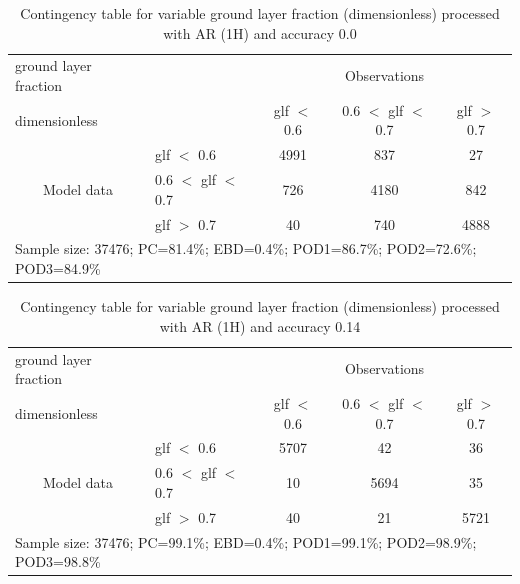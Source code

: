 \documentclass[a4paper,english]{article}
\begin{document}
\begin{table}[]
\begin{center}
\begin{tabular}{llccc}
\hline
{ground layer fraction}                                       &                                                    & \multicolumn{3}{c}{Observations}                 \\
{dimensionless}                                       &                             & glf $<$ 0.6   & 0.6 $<$ glf $<$ 0.7 & glf $>$ 0.7 \\
\hline
\multicolumn{1}{c}{\multirow{3}{*}{Model data}}  & glf $<$ 0.6             & 4991                & 837                       & 27              \\
                                                 & 0.6  $<$ glf $<$ 0.7 & 726                & 4180                       & 842              \\
                                                 & glf $>$ 0.7             & 40                & 740                       & 4888              \\
\hline
\multicolumn{5}{l}{Sample size: 37476; PC=81.4\%; EBD=0.4\%; POD1=86.7\%; POD2=72.6\%; POD3=84.9\%}
\end{tabular}
\end{center}
\caption{Contingency table for variable ground layer fraction (dimensionless) processed with AR (1H) and accuracy 0.0}
\label{tab:contingencyglfAFT}
\end{table}
\begin{table}[]
\begin{center}
\begin{tabular}{llccc}
\hline
{ground layer fraction}                                       &                                                    & \multicolumn{3}{c}{Observations}                 \\
{dimensionless}                                       &                             & glf $<$ 0.6   & 0.6 $<$ glf $<$ 0.7 & glf $>$ 0.7 \\
\hline
\multicolumn{1}{c}{\multirow{3}{*}{Model data}}  & glf $<$ 0.6             & 5707                & 42                       & 36              \\
                                                 & 0.6  $<$ glf $<$ 0.7 & 10                & 5694                       & 35              \\
                                                 & glf $>$ 0.7             & 40                & 21                       & 5721              \\
\hline
\multicolumn{5}{l}{Sample size: 37476; PC=99.1\%; EBD=0.4\%; POD1=99.1\%; POD2=98.9\%; POD3=98.8\%}
\end{tabular}
\end{center}
\caption{Contingency table for variable ground layer fraction (dimensionless) processed with AR (1H) and accuracy 0.14}
\label{tab:contingencyglfAFT}
\end{table}
\end{document}
